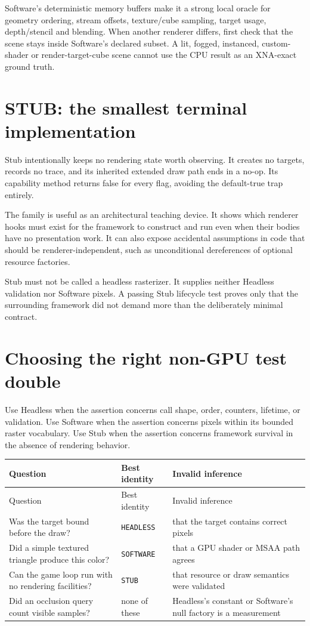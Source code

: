 Software's deterministic memory buffers make it a strong local oracle for geometry ordering,
stream offsets, texture/cube sampling, target usage, depth/stencil and blending. When another
renderer differs, first check that the scene stays inside Software's declared subset. A lit,
fogged, instanced, custom-shader or render-target-cube scene cannot use the CPU result as an
XNA-exact ground truth.

\section{STUB: the smallest terminal implementation}

Stub intentionally keeps no rendering state worth observing.  It creates no targets, records no
trace, and its inherited extended draw path ends in a no-op.  Its capability method returns
false for every flag, avoiding the default-true trap entirely.

The family is useful as an architectural teaching device.  It shows which renderer hooks must
exist for the framework to construct and run even when their bodies have no presentation work.
It can also expose accidental assumptions in code that should be renderer-independent, such as
unconditional dereferences of optional resource factories.

Stub must not be called a headless rasterizer.  It supplies neither Headless validation nor
Software pixels.  A passing Stub lifecycle test proves only that the surrounding framework did
not demand more than the deliberately minimal contract.

\section{Choosing the right non-GPU test double}

Use Headless when the assertion concerns call shape, order, counters, lifetime, or validation.
Use Software when the assertion concerns pixels within its bounded raster vocabulary.  Use Stub
when the assertion concerns framework survival in the absence of rendering behavior.

\begin{longtable}{p{}p{}p{}}
\toprule
Question & Best identity & Invalid inference \\
\midrule
\endfirsthead
\toprule
Question & Best identity & Invalid inference \\
\midrule
\endhead
Was the target bound before the draw? & \texttt{HEADLESS} & that the target contains correct pixels \\
Did a simple textured triangle produce this color? & \texttt{SOFTWARE} & that a GPU shader or MSAA path agrees \\
Can the game loop run with no rendering facilities? & \texttt{STUB} & that resource or draw semantics were validated \\
Did an occlusion query count visible samples? & none of these & Headless's constant or Software's null factory is a measurement \\
\bottomrule
\end{longtable}

